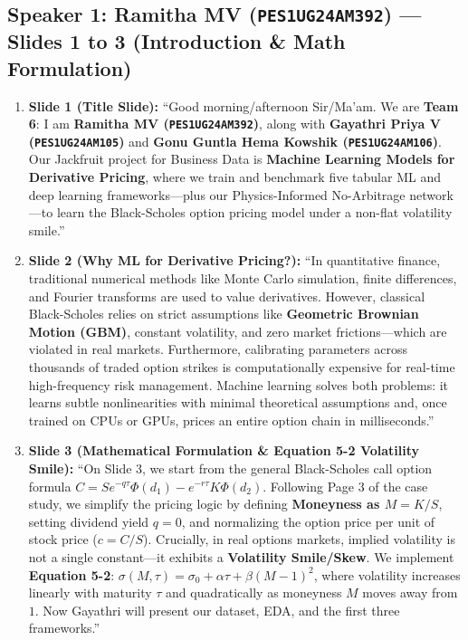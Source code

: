 \documentclass[10pt]{article}
\begin{document}
\subsection*{\color{navy}Speaker 1: Ramitha MV (\texttt{PES1UG24AM392}) --- Slides 1 to 3 (Introduction \& Math Formulation)}
\begin{enumerate}
    \item \textbf{Slide 1 (Title Slide):}
    ``Good morning/afternoon Sir/Ma'am. We are \textbf{Team 6}: I am \textbf{Ramitha MV (\texttt{PES1UG24AM392})}, along with \textbf{Gayathri Priya V (\texttt{PES1UG24AM105})} and \textbf{Gonu Guntla Hema Kowshik (\texttt{PES1UG24AM106})}. Our Jackfruit project for Business Data is \textbf{Machine Learning Models for Derivative Pricing}, where we train and benchmark five tabular ML and deep learning frameworks---plus our Physics-Informed No-Arbitrage network---to learn the Black-Scholes option pricing model under a non-flat volatility smile.''

    \item \textbf{Slide 2 (Why ML for Derivative Pricing?):}
    ``In quantitative finance, traditional numerical methods like Monte Carlo simulation, finite differences, and Fourier transforms are used to value derivatives. However, classical Black-Scholes relies on strict assumptions like \textbf{Geometric Brownian Motion (GBM)}, constant volatility, and zero market frictions---which are violated in real markets. Furthermore, calibrating parameters across thousands of traded option strikes is computationally expensive for real-time high-frequency risk management. Machine learning solves both problems: it learns subtle nonlinearities with minimal theoretical assumptions and, once trained on CPUs or GPUs, prices an entire option chain in milliseconds.''

    \item \textbf{Slide 3 (Mathematical Formulation \& Equation 5-2 Volatility Smile):}
    ``On Slide 3, we start from the general Black-Scholes call option formula $C = S e^{-q\tau}\Phi(d_1) - e^{-r\tau}K\Phi(d_2)$. Following Page 3 of the case study, we simplify the pricing logic by defining \textbf{Moneyness as $M = K/S$}, setting dividend yield $q = 0$, and normalizing the option price per unit of stock price ($c = C/S$). Crucially, in real options markets, implied volatility is not a single constant---it exhibits a \textbf{Volatility Smile/Skew}. We implement \textbf{Equation 5-2}: $\sigma(M,\tau) = \sigma_0 + \alpha\tau + \beta(M-1)^2$, where volatility increases linearly with maturity $\tau$ and quadratically as moneyness $M$ moves away from $1$. Now Gayathri will present our dataset, EDA, and the first three frameworks.''
\end{enumerate}
\end{document}
